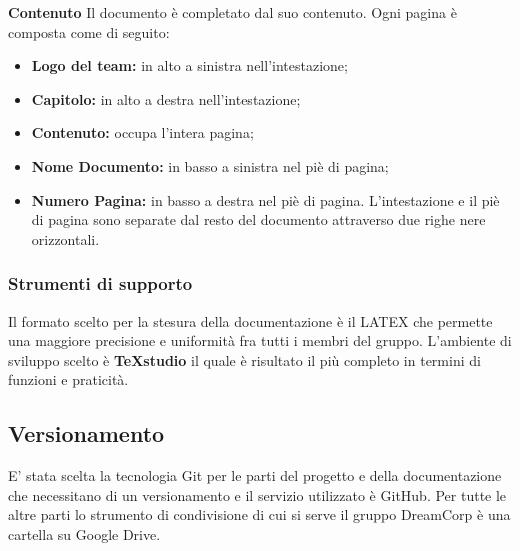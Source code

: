 		\newline \newline \textbf{Contenuto}  Il documento è completato dal suo contenuto. Ogni pagina è composta come di seguito:\newline
		\begin{itemize}
			\item \textbf{Logo del team:} in alto a sinistra nell'intestazione;
			\item \textbf{Capitolo:} in alto a destra nell'intestazione;
			\item \textbf{Contenuto:} occupa l'intera pagina;
			\item \textbf{Nome Documento:} in basso a sinistra nel piè di pagina;
			\item \textbf{Numero Pagina:} in basso a destra nel piè di pagina. \newline
			L'intestazione e il piè di pagina sono separate dal resto del documento attraverso due righe nere orizzontali.
		\end{itemize}
		\subsubsection{Strumenti di supporto}
			Il formato scelto per la stesura della documentazione è il  LATEX che permette una maggiore precisione e uniformità fra tutti i membri del gruppo. L'ambiente di sviluppo scelto è \textbf{TeXstudio} il quale è risultato il più completo in termini di funzioni e praticità.
	\subsection{Versionamento}
		E' stata scelta la tecnologia Git per le parti del progetto e della documentazione che necessitano di un versionamento e il servizio utilizzato è GitHub. Per tutte le altre parti lo strumento di condivisione di cui si serve il gruppo DreamCorp è una cartella su Google Drive.
